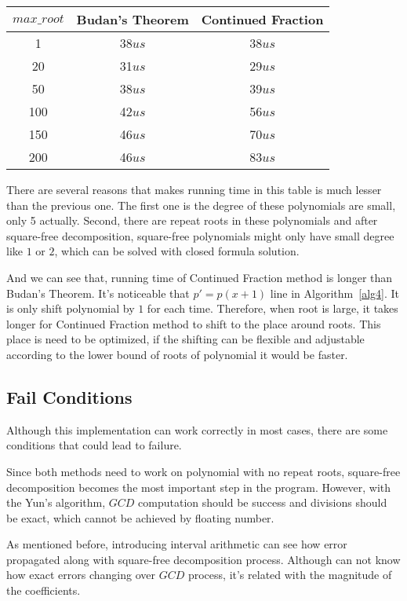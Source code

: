 \begin{center}
\label{tb3}
\begin{tabular}{ |c|c|c| } 
 \hline

 $max\_root$  & Budan's Theorem & Continued Fraction\\ 

 \hline
 1   & 38$us$  & 38$us$\\ 
 20   & 31$us$  & 29$us$\\ 
 50   & 38$us$  & 39$us$\\ 
 100   & 42$us$  & 56$us$\\ 
 150   & 46$us$  & 70$us$\\ 
 200   & 46$us$  & 83$us$\\ 
 \hline
\end{tabular}
\end{center}

There are several reasons that makes running time in this table is much lesser
than the previous one. The first one is the degree of these polynomials are
small, only 5 actually. Second, there are repeat roots in these polynomials and
after square-free decomposition, square-free polynomials might only have small
degree like $1$ or $2$, which can be solved with closed formula solution.

And we can see that, running time of Continued Fraction method is longer than
Budan's Theorem. It's noticeable that $p'=p(x+1)$ line in Algorithm~\ref{alg4}.
It is only shift polynomial by $1$ for each time. Therefore, when root is large,
it takes longer for Continued Fraction method to shift to the place around
roots. This place is need to be optimized, if the shifting can be flexible and
adjustable according to the lower bound of roots of polynomial it would be
faster.

\subsection{Fail Conditions}

Although this implementation can work correctly in most cases, there are
some conditions that could lead to failure. 

Since both methods need to work on polynomial with no repeat roots, square-free
decomposition becomes the most important step in the program. However, with the
Yun's algorithm\cite{Yuns}, $GCD$ computation should be success and divisions
should be exact, which cannot be achieved by floating number. 

As mentioned before, introducing interval arithmetic can see how error
propagated along with square-free decomposition process. Although can not know
how exact errors changing over $GCD$ process, it's related with the magnitude of
the coefficients. 

